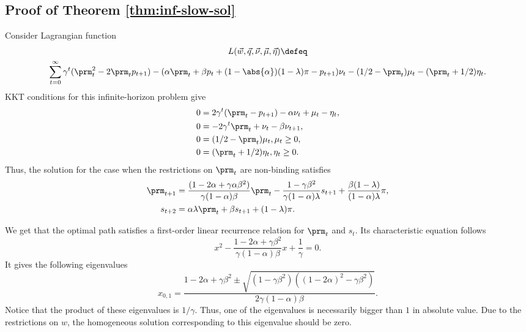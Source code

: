 \subsection{Proof of Theorem \ref{thm:inf-slow-sol}}
\label{sec:proof-inf-slow-sol}

Consider Lagrangian function
\begin{multline*}
    L(\vec{w}, \vec{q}, \vec{\nu}, \vec{\mu}, \vec{\eta}) \defeq\\
    \sum_{t=0}^\infty \gamma^t (\prm_t^2 - 2 \prm_t p_{t+1}) - (\alpha \prm_t + \beta p_t
    + (1 - \abs{\alpha}) (1 - \lambda) \pi - p_{t+1}) \nu_t - (1 / 2 - \prm_t)
    \mu_t - (\prm_t + 1 / 2) \eta_t.
\end{multline*}
KKT conditions for this infinite-horizon problem \citep[see Section 4.5
of][]{s89r} give
\[
    \begin{aligned}
        0 &= 2 \gamma^t (\prm_t - p_{t+1}) - \alpha \nu_t + \mu_t - \eta_t,\\
        0 &= -2 \gamma^t \prm_t + \nu_t - \beta \nu_{t+1},\\
        0 &= (1 / 2 - \prm_t) \mu_t, \mu_t \ge 0,\\
        0 &= (\prm_t + 1 / 2) \eta_t, \eta_t \ge 0.
    \end{aligned}
\]
Thus, the solution for the case when the restrictions on $\prm_t$ are non-binding
satisfies
\[
    \begin{aligned}
        \prm_{t+1} &= \frac{(1 - 2 \alpha + \gamma \alpha \beta^2)}{\gamma (1 -
        \alpha) \beta} \prm_t - \frac{1 - \gamma \beta^2}{\gamma (1 - \alpha)
        \lambda} s_{t+1} + \frac{\beta (1 - \lambda)}{(1 - \alpha) \lambda}
        \pi,\\
        s_{t+2} &= \alpha \lambda \prm_t + \beta s_{t+1} + (1 - \lambda) \pi.
    \end{aligned}
\]

We get that the optimal path satisfies a first-order linear recurrence relation
for $\prm_t$ and $s_t$. Its characteristic equation follows
\[
    x^2 - \frac{1 - 2 \alpha + \gamma \beta^2}{\gamma (1 - \alpha) \beta} x +
    \frac{1}{\gamma} = 0.
\]
It gives the following eigenvalues
\[
    x_{0,1} = \frac{1 - 2 \alpha + \gamma \beta^2 \pm
    \sqrt{(1 - \gamma \beta^2) ((1 - 2 \alpha)^2 - \gamma \beta^2)}}{2 \gamma
    (1 - \alpha) \beta}.
\]
Notice that the product of these eigenvalues is $1/\gamma$. Thus, one of the
eigenvalues is necessarily bigger than $1$ in absolute value. Due to the
restrictions on $w$, the homogeneous solution corresponding to this eigenvalue
should be zero.

